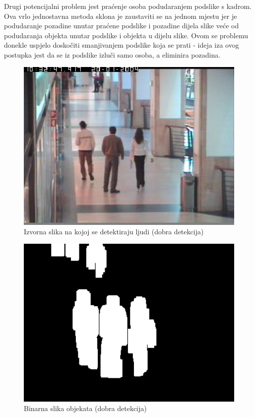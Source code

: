 \documentclass[utf8, seminar, numeric, times]{fer}
\begin{document}
Drugi potencijalni problem jest praćenje osoba podudaranjem podslike s kadrom. Ova vrlo jednostavna metoda sklona je zaustaviti se na jednom mjestu jer je podudaranje pozadine unutar praćene podslike i pozadine dijela slike veće od podudaranja objekta unutar podslike i objekta u dijelu slike. Ovom se problemu donekle uspjelo doskočiti smanjivanjem podslike koja se prati - ideja iza ovog postupka jest da se iz podslike izluči samo osoba, a eliminira pozadina. 

\begin{figure}
\centering
\includegraphics[width=1\textwidth]{dobra_original.png}
\caption{Izvorna slika na kojoj se detektiraju ljudi (dobra detekcija)}
\label{dobra_original}
\end{figure}

\begin{figure}
\centering
\includegraphics[width=1\textwidth]{dobra_fore.png}
\caption{Binarna slika objekata (dobra detekcija)}
\label{dobra_fore}
\end{figure}
\end{document}
